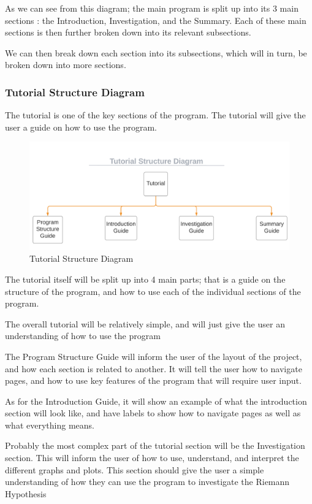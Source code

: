 \documentclass{article}
\begin{document}
As we can see from this diagram; the main program is split up into its 3 main sections : the Introduction, Investigation, and the Summary. Each of these main sections is then further broken down into its relevant subsections.

We can then break down each section into its subsections, which will in turn, be broken down into more sections.

\subsubsection{Tutorial Structure Diagram}

The tutorial is one of the key sections of the program. The tutorial will give the user a guide on how to use the program.

\begin{figure}[h]
    \centering
    \captionsetup{justification=centering}
    \includegraphics[scale=0.43]{tutorial-structure-diagram}
    \caption{Tutorial Structure Diagram}
\end{figure}

The tutorial itself will be split up into 4 main parts; that is a guide on the structure of the program, and how to use each of the individual sections of the program.

The overall tutorial will be relatively simple, and will just give the user an understanding of how to use the program

The Program Structure Guide will inform the user of the layout of the project, and how each section is related to another. It will tell the user how to navigate pages, and how to use key features of the program that will require user input.

As for the Introduction Guide, it will show an example of what the introduction section will look like, and have labels to show how to navigate pages as well as what everything means.

Probably the most complex part of the tutorial section will be the Investigation section. This will inform the user of how to use, understand, and interpret the different graphs and plots. This section should give the user a simple understanding of how they can use the program to investigate the Riemann Hypothesis
\end{document}
